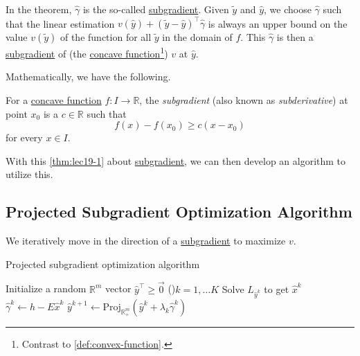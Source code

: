 In the theorem, \(\hat{\gamma}\) is the so-called \hyperref[def:subgradient]{subgradient}. Given \(\widetilde{y}\) and \(\hat{y}\), we choose \(\hat{\gamma}\) such that the linear estimation \(v(\hat{y})+(\widetilde{y} - \hat{y})^{\top}\hat{\gamma}\) is always an upper bound on the value \(v(\widetilde{y})\) of the function for all \(\widetilde{y}\) in the domain of \(f\). This \(\hat{\gamma}\) is then a \hyperref[def:subgradient]{subgradient} of (the \hyperref[def:convex-function]{concave function}\footnote{Contrast to \autoref{def:convex-function}.}) \(v\) at \(\hat{y}\).

Mathematically, we have the following.

\begin{definition}[Subgradient]\label{def:subgradient}
	For a \hyperref[def:convex-function]{concave function} \(f\colon I\to \mathbb{R}\), the \emph{subgradient} (also known as \emph{subderivative}) at point \(x_0\) is a \(c\in \mathbb{R}\) such that
	\[
		f(x) - f(x_{0})\geq c(x - x_0)
	\]
	for every \(x\in I\).
\end{definition}

With this \autoref{thm:lec19-1} about \hyperref[def:subgradient]{subgradient}, we can then develop an algorithm to utilize this.

\subsection{Projected Subgradient Optimization Algorithm}
\begin{intuition}
	We iteratively move in the direction of a \hyperref[def:subgradient]{subgradient} to maximize \(v\).
\end{intuition}

\begin{algorithm}[H]\label{algo:projected-subgradient-optimization-algorithm}
	\DontPrintSemicolon
	\caption{Projected subgradient optimization algorithm}
	\BlankLine

	Initialize a random \(\mathbb{R} ^m\) vector \(\hat{y}^{\top}\geq \vec{0}\)\;
	\For(){\(k = 1, \dots K\)}{
	Solve \(L_{\hat{y}^k}\) to get \(\hat{x}^k\)\;
	\(\hat{\gamma}^k \gets h - E \hat{x}^k\)\;
	\(\hat{y}^{k+1} \gets \mathrm{Proj}_{\mathbb{R}^m_+}(\hat{y}^k + \lambda_{k}\hat{\gamma}^k) \)\;\label{algo:projected-subgradient-optimization-algorithm:line5}
	}
	\;
\end{algorithm}

